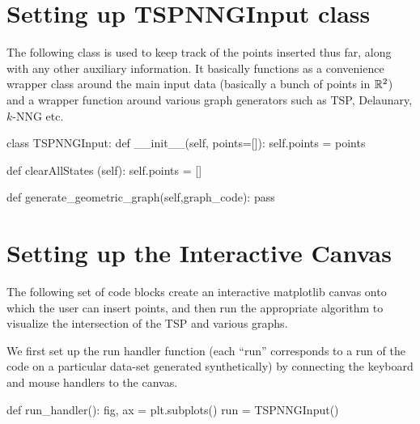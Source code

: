 \section{Setting up TSPNNGInput class}

The following class is used to keep track of the points inserted thus far, along with 
any other auxiliary information. It basically functions as a convenience wrapper class around 
the main input data (basically a bunch of points in $\mathbb{R}^2$) and a wrapper function around 
various graph generators such as TSP, Delaunary, $k\text{-}$NNG etc. 

\nwenddocs{}\plusendmoddef\nwstartdeflinemarkup{}\nwenddeflinemarkup
class TSPNNGInput:
      def __init__(self, points=[]):
          self.points            = points

      def clearAllStates (self):
          self.points = []

      def generate_geometric_graph(self,graph_code):
           pass
\nwendcode{}\nwdocspar

\section{Setting up the Interactive Canvas}
The following set of code blocks create an interactive matplotlib canvas onto which the user can insert points, and then 
run the appropriate algorithm to visualize the intersection of the TSP and various graphs. 

We first set up the run handler function (each ``run'' corresponds to a run of the code on a particular data-set generated synthetically)
by connecting the keyboard and mouse handlers to the canvas. 

\nwenddocs{}\endmoddef\nwstartdeflinemarkup{}\nwenddeflinemarkup
def run_handler():
    fig, ax =  plt.subplots()
    run = TSPNNGInput()
    
